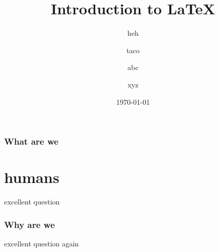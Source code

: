 \documentclass{beamer}
\begin{document}
    \begin{frame}
        \title{Introduction to \LaTeX{}}
        \author{taco \and 
        abc \and
        xyz}
        \date{\today}
        \subtitle{heh}
        \maketitle
    \end{frame}
    \begin{frame}
    \tableofcontents
        \frametitle{What are we}
        \section{humans}
        excellent question
    \end{frame}
    \begin{frame}
        \frametitle{Why are we}
        \tableofcontents
        excellent question again
    \end{frame}
\end{document}
